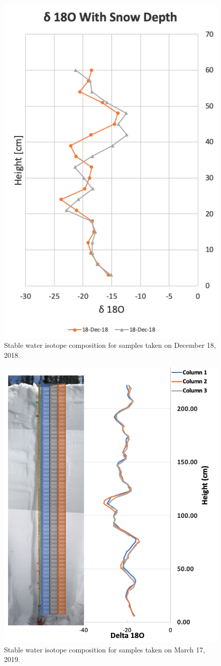 \begin{figure}[H]
    \centering
    \includegraphics[width=0.7\linewidth]{figures/Isotopes/Dec18_Isotopes.png}
    \caption{Stable water isotope composition for samples taken on December 18, 2018. }
    \label{fig:Dec18_Isotopes}
\end{figure}

\begin{figure}[H]
    \centering
    \includegraphics[width=0.7\linewidth]{figures/Isotopes/Mar17_Isotopes.png}
    \caption{Stable water isotope composition for samples taken on March 17, 2019.}
    \label{fig:Mar17_Isotopes}
\end{figure}